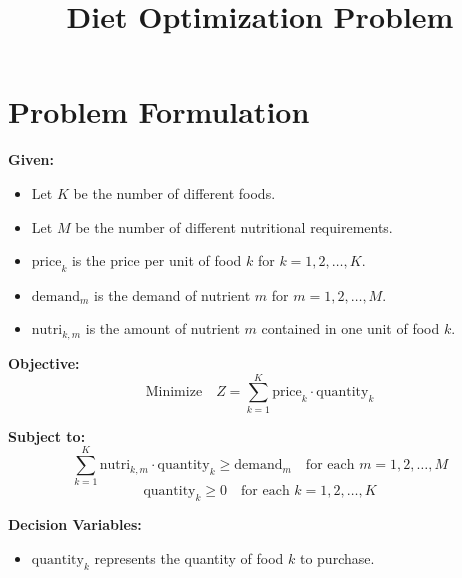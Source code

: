 \documentclass{article}
\begin{document}
\title{Diet Optimization Problem}
\author{}
\date{}
\maketitle

\section*{Problem Formulation}

\textbf{Given:}
\begin{itemize}
    \item Let \( K \) be the number of different foods.
    \item Let \( M \) be the number of different nutritional requirements.
    \item \( \text{price}_k \) is the price per unit of food \( k \) for \( k = 1, 2, \ldots, K \).
    \item \( \text{demand}_m \) is the demand of nutrient \( m \) for \( m = 1, 2, \ldots, M \).
    \item \( \text{nutri}_{k,m} \) is the amount of nutrient \( m \) contained in one unit of food \( k \).
\end{itemize}

\textbf{Objective:}
\[
\text{Minimize} \quad Z = \sum_{k=1}^{K} \text{price}_k \cdot \text{quantity}_k
\]

\textbf{Subject to:}
\[
\sum_{k=1}^{K} \text{nutri}_{k,m} \cdot \text{quantity}_k \geq \text{demand}_m \quad \text{for each } m = 1, 2, \ldots, M
\]
\[
\text{quantity}_k \geq 0 \quad \text{for each } k = 1, 2, \ldots, K
\]

\textbf{Decision Variables:}
\begin{itemize}
    \item \( \text{quantity}_k \) represents the quantity of food \( k \) to purchase.
\end{itemize}
\end{document}
